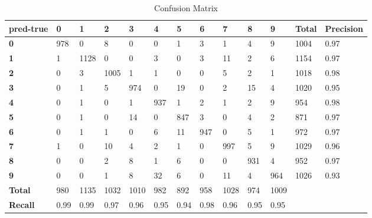 \begin{table}[h]
  \centering
\caption{Confusion Matrix}
\label{confusion-matrix}
\begin{tabular}{|l|l|l|l|l|l|l|l|l|l|l|l|l|}
\hline
\textbf{pred-true} & \textbf{0} & \textbf{1} & \textbf{2} & \textbf{3} & \textbf{4} & \textbf{5} & \textbf{6} & \textbf{7} & \textbf{8} & \textbf{9} & \textbf{Total} & \textbf{Precision} \\ \hline
\textbf{0}         & 978        & 0          & 8          & 0          & 0          & 1          & 3          & 1          & 4          & 9          & 1004           & 0.97               \\ \hline
\textbf{1}         & 1          & 1128       & 0          & 0          & 3          & 0          & 3          & 11         & 2          & 6          & 1154           & 0.97               \\ \hline
\textbf{2}         & 0          & 3          & 1005       & 1          & 1          & 0          & 0          & 5          & 2          & 1          & 1018           & 0.98               \\ \hline
\textbf{3}         & 0          & 1          & 5          & 974        & 0          & 19         & 0          & 2          & 15         & 4          & 1020           & 0.95               \\ \hline
\textbf{4}         & 0          & 1          & 0          & 1          & 937        & 1          & 2          & 1          & 2          & 9          & 954            & 0.98               \\ \hline
\textbf{5}         & 0          & 1          & 0          & 14         & 0          & 847        & 3          & 0          & 4          & 2          & 871            & 0.97               \\ \hline
\textbf{6}         & 0          & 1          & 1          & 0          & 6          & 11         & 947        & 0          & 5          & 1          & 972            & 0.97               \\ \hline
\textbf{7}         & 1          & 0          & 10         & 4          & 2          & 1          & 0          & 997        & 5          & 9          & 1029           & 0.96               \\ \hline
\textbf{8}         & 0          & 0          & 2          & 8          & 1          & 6          & 0          & 0          & 931        & 4          & 952            & 0.97               \\ \hline
\textbf{9}         & 0          & 0          & 1          & 8          & 32         & 6          & 0          & 11         & 4          & 964        & 1026           & 0.93               \\ \hline
\textbf{Total}     & 980        & 1135       & 1032       & 1010       & 982        & 892        & 958        & 1028       & 974        & 1009       &           &                    \\ \hline
\textbf{Recall}    & 0.99       & 0.99       & 0.97       & 0.96       & 0.95       & 0.94       & 0.98       & 0.96       & 0.95       & 0.95       &                &                    \\ \hline
\end{tabular}
\end{table}
